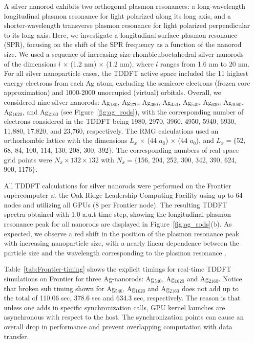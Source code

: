 \documentclass[journal=jctcce,manuscript=article,etalmode=truncate,maxauthors=10,layout=twocolumn,9pt]{achemso}   %
\begin{document}
A silver nanorod exhibits two orthogonal plasmon resonances: a long-wavelength longitudinal plasmon resonance for light polarized along its long axis, and a shorter-wavelength transverse plasmon resonance for light polarized perpendicular to its long axis.  Here, we investigate  a longitudinal surface  plasmon resonance (SPR), focusing on the shift of the SPR  frequency as a function of the nanorod size.   We used a sequence of   increasing size  rhombicuboctahedral  silver nanorods  of the dimensions  $l$  $\times$ (1.2 nm) $\times$ (1.2 nm),   where $l$  ranges  from 1.6 nm  to  20 nm.  
For all silver  nanoparticle cases, the TDDFT active space  included the 11  highest energy electrons from each Ag atom, excluding the semicore electrons (frozen core approximation) and 1000-2000 unoccupied (virtual) orbitals.
Overall, we considered  nine   silver nanorods:  Ag$_{180}$, Ag$_{270}$,  Ag$_{360}$, Ag$_{450}$, Ag$_{540}$,  Ag$_{630}$, Ag$_{1080}$, Ag$_{1620}$, and  Ag$_{2160}$  (see Figure~\ref{fig:ag_rods}),  with the corresponding number of electrons considered  in the TDDFT being  1980,  2970,  3960,  4950,  5940,  6930,  11,880,   17,820,  and  23,760, respectively.  The RMG calculations used an orthorhombic  lattice with the dimensions $L_x$ $\times$ (44 $a_0$)   $\times$ (44 $a_0$), and $L_x = \{$52, 68, 84, 100, 114, 130, 208, 300, 392$\}$. The corresponding numbers of real space grid points were $N_x \times 132 \times 132$ with $N_x = \{$156, 204,  252,  300, 342,  390,  624, 900, 1176$\}$.


All TDDFT calculations for silver nanorods were performed on the Frontier supercomputer at the Oak Ridge Leadership Computing Facility using up to 64 nodes and utilizing all GPUs (8 per Frontier node). The resulting TDDFT spectra obtained with 1.0 a.u.t time step, showing the longitudinal plasmon resonance peak for all nanorods are displayed in Figure~\ref{fig:ag_rods}(b). As expected, we observe a red shift in the position of the plasmon resonance peak with increasing nanoparticle size, with a nearly linear dependence between the particle size and the wavelength corresponding to the plasmon resonance \cite{plasmon-size-dependence-2022}.

Table~\ref{tab:Frontier-timing} shows the explicit timings for real-time TDDFT simulations on Frontier for three Ag-nanorods: Ag$_{540}$,  Ag$_{1620}$ and Ag$_{2160}$. Notice that broken sub timing shown for Ag$_{540}$, Ag$_{1620}$ and  Ag$_{2160}$ does not add up to the total of 110.06 sec, 378.6  sec and 634.3 sec, respectively. The reason is that unless one adds in specific synchronization calls, GPU kernel launches are asynchronous with respect to the host. The synchronization points can cause an overall drop in performance and prevent overlapping computation with data transfer. 
\end{document}
